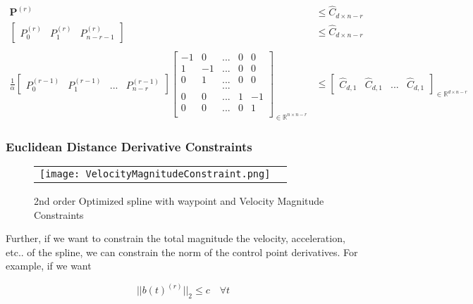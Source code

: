 \documentclass{article}
\begin{document}
\begin{equation}
\begin{aligned}
    \textbf{P}^{(r)}  & \leq \hat{C}_{d \times n-r} \\
    \begin{bmatrix}
    P_0^{(r)} & P_1^{(r)} & P_{n-r-1}^{(r)}
    \end{bmatrix}  & \leq \hat{C}_{d \times n-r} \\\\
    \frac{1}{\alpha} \begin{bmatrix}
        P_0^{(r-1)} & P_1^{(r-1)} & ... & P_{n-r}^{(r-1)}
    \end{bmatrix}
    \begin{bmatrix}
    -1 &  0 & ... & 0 & 0 \\
     1 & -1 & ... & 0 & 0 \\
     0 &  1 & ... & 0  & 0  \\
       &    & ... &   &   \\
     0  &  0 & ... & 1 & -1 \\
     0 &  0 & ... & 0 & 1 \\
    \end{bmatrix} _{\in \mathbb{R}^{n \times n-r}} & \leq 
    \begin{bmatrix}
    \hat{C}_{d,1} & \hat{C}_{d,1}  & ... & \hat{C}_{d,1} 
    \end{bmatrix}_{\in \mathbb{R}^{d \times n-r}}
\end{aligned}
\end{equation}

\subsubsection{Euclidean Distance Derivative Constraints}

\begin{figure}[h]
\begin{tabular}{ll}
\texttt{[image: VelocityMagnitudeConstraint.png]}
\end{tabular}
\caption{2nd order Optimized spline with waypoint and Velocity Magnitude Constraints}
\label{Fig:VelocityMagnitudeConstraint.png}
\end{figure}

Further, if we want to constrain the total magnitude the velocity, acceleration, etc.. of the spline, we can constrain the norm of the control point derivatives. For example, if we want

\begin{equation}
    ||b(t)^{(r)}||_2 \leq c \quad \forall t
\end{equation}
\end{document}
